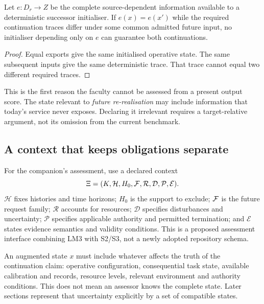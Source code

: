 \begin{proposition}
\label{prop:export}
Let \(e:D_r\to Z\) be the complete source-dependent information available to a deterministic successor initialiser. If \(e(x)=e(x')\) while the required continuation traces differ under some common admitted future input, no initialiser depending only on \(e\) can guarantee both continuations.
\end{proposition}
\begin{proof}
Equal exports give the same initialised operative state. The same subsequent inputs give the same deterministic trace. That trace cannot equal two different required traces.
\end{proof}

This is the first reason the faculty cannot be assessed from a present output score. The state relevant to \emph{future re-realisation} may include information that today's service never exposes. Declaring it irrelevant requires a target-relative argument, not its omission from the current benchmark.

\subsection{A context that keeps obligations separate}

For the companion's assessment, use a declared context
\begin{equation}
\Xi=(K,\mathcal H,H_0,\mathcal F,\mathcal R,\mathcal D,\mathcal P,\mathcal E).
\label{eq:context}
\end{equation}
\(\mathcal H\) fixes histories and time horizons; \(H_0\) is the support to exclude; \(\mathcal F\) is the future request family; \(\mathcal R\) accounts for resources; \(\mathcal D\) specifies disturbances and uncertainty; \(\mathcal P\) specifies applicable authority and permitted termination; and \(\mathcal E\) states evidence semantics and validity conditions. This is a proposed assessment interface combining LM3 with S2/S3, not a newly adopted repository schema.

An augmented state \(x\) must include whatever affects the truth of the continuation claim: operative configuration, consequential task state, available calibration and records, resource levels, relevant environment and authority conditions. This does not mean an assessor knows the complete state. Later sections represent that uncertainty explicitly by a set of compatible states.

